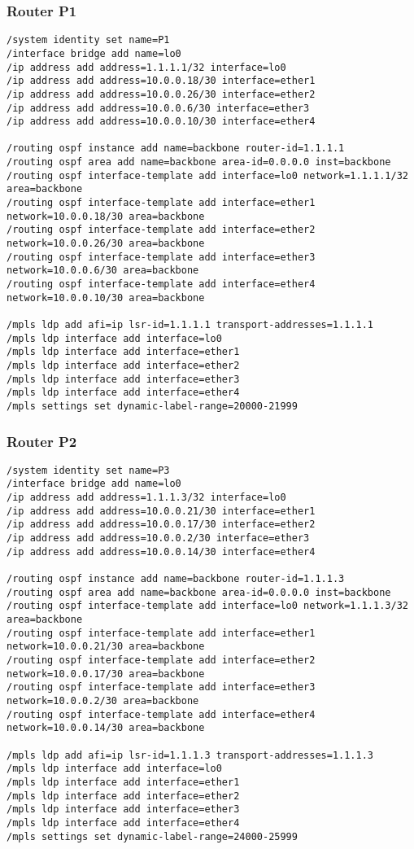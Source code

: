 \subsubsection*{Router P1}
\begin{lstlisting}[language=RouterOS]
/system identity set name=P1
/interface bridge add name=lo0
/ip address add address=1.1.1.1/32 interface=lo0
/ip address add address=10.0.0.18/30 interface=ether1
/ip address add address=10.0.0.26/30 interface=ether2
/ip address add address=10.0.0.6/30 interface=ether3
/ip address add address=10.0.0.10/30 interface=ether4

/routing ospf instance add name=backbone router-id=1.1.1.1
/routing ospf area add name=backbone area-id=0.0.0.0 inst=backbone
/routing ospf interface-template add interface=lo0 network=1.1.1.1/32 area=backbone
/routing ospf interface-template add interface=ether1 network=10.0.0.18/30 area=backbone
/routing ospf interface-template add interface=ether2 network=10.0.0.26/30 area=backbone
/routing ospf interface-template add interface=ether3 network=10.0.0.6/30 area=backbone
/routing ospf interface-template add interface=ether4 network=10.0.0.10/30 area=backbone

/mpls ldp add afi=ip lsr-id=1.1.1.1 transport-addresses=1.1.1.1
/mpls ldp interface add interface=lo0
/mpls ldp interface add interface=ether1
/mpls ldp interface add interface=ether2
/mpls ldp interface add interface=ether3
/mpls ldp interface add interface=ether4
/mpls settings set dynamic-label-range=20000-21999
\end{lstlisting}

\subsubsection*{Router P2}
\begin{lstlisting}[language=RouterOS]
/system identity set name=P3
/interface bridge add name=lo0
/ip address add address=1.1.1.3/32 interface=lo0
/ip address add address=10.0.0.21/30 interface=ether1
/ip address add address=10.0.0.17/30 interface=ether2
/ip address add address=10.0.0.2/30 interface=ether3
/ip address add address=10.0.0.14/30 interface=ether4

/routing ospf instance add name=backbone router-id=1.1.1.3
/routing ospf area add name=backbone area-id=0.0.0.0 inst=backbone
/routing ospf interface-template add interface=lo0 network=1.1.1.3/32 area=backbone
/routing ospf interface-template add interface=ether1 network=10.0.0.21/30 area=backbone
/routing ospf interface-template add interface=ether2 network=10.0.0.17/30 area=backbone
/routing ospf interface-template add interface=ether3 network=10.0.0.2/30 area=backbone
/routing ospf interface-template add interface=ether4 network=10.0.0.14/30 area=backbone

/mpls ldp add afi=ip lsr-id=1.1.1.3 transport-addresses=1.1.1.3
/mpls ldp interface add interface=lo0
/mpls ldp interface add interface=ether1
/mpls ldp interface add interface=ether2
/mpls ldp interface add interface=ether3
/mpls ldp interface add interface=ether4
/mpls settings set dynamic-label-range=24000-25999
\end{lstlisting}

